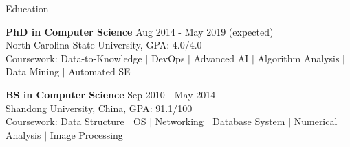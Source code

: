 \documentclass{resume} %
\begin{document}

\vspace{2em}

\begin{rSection}{Education}

{\bf PhD in Computer Science} \hfill {Aug 2014 - May 2019 (expected)}\\ 
North Carolina State University, GPA: 4.0/4.0  \\
Coursework: Data-to-Knowledge $|$ DevOps $|$ Advanced AI $|$ Algorithm Analysis $|$ Data Mining $|$ Automated SE

{\bf BS in Computer Science} \hfill {Sep 2010 - May 2014}\\ 
Shandong University, China, GPA: 91.1/100  \\
Coursework: Data Structure $|$ OS $|$ Networking $|$ Database System $|$ Numerical Analysis $|$ Image Processing

\end{rSection} 

\end{document}
